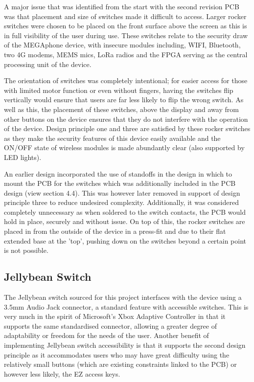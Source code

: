 A major issue that was identified from the start with the second revision PCB was that placement and size of switches made it difficult to access.
Larger rocker switches were chosen to be placed on the front surface above the screen as this is in full visibility of the user during use.
These switches relate to the security draw of the MEGAphone device, with insecure modules including, WIFI, Bluetooth, two 4G modems, MEMS mics, LoRa radios and the FPGA serving as the central processing unit of the device.

The orientation of switches was completely intentional; for easier access for those with limited motor function or even without fingers, having the switches flip vertically would ensure that users are far less likely to flip the wrong switch.
As well as this, the placement of these switches, above the display and away from other buttons on the device ensures that they do not interfere with the operation of the device.
Design principle one and three are satisfied by these rocker switches as they make the security features of this device easily available and the ON/OFF state of wireless modules is made abundantly clear (also supported by LED lights).

An earlier design incorporated the use of standoffs in the design in which to mount the PCB for the switches which was additionally included in the PCB design (view section 4.4). %
This was however later removed in support of design principle three to reduce undesired complexity.
Additionally, it was considered completely unnecessary as when soldered to the switch contacts, the PCB would hold in place, securely and without issue.
On top of this, the rocker switches are placed in from the outside of the device in a press-fit and due to their flat extended base at the 'top', pushing down on the switches beyond a certain point is not possible.

\subsection{Jellybean Switch}

The Jellybean switch sourced for this project interfaces with the device using a 3.5mm Audio Jack connector, a standard feature with accessible switches.
This is very much in the spirit of Microsoft's Xbox Adaptive Controller\cite{adaptive} in that it supports the same standardised connector, allowing a greater degree of adaptability or freedom for the needs of the user.
Another benefit of implementing Jellybean switch accessibility is that it supports the second design principle as it accommodates users who may have great difficulty using the relatively small buttons (which are existing constraints linked to the PCB) or however less likely, the EZ access keys.

